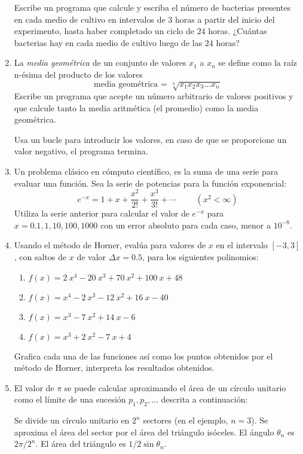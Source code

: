 \documentclass[12pt]{article}
\begin{document}
\begin{enumerate}
\par
Escribe un programa que calcule y escriba el número de bacterias presentes en cada medio de cultivo en intervalos de $3$ horas a partir del inicio del experimento, hasta haber completado un ciclo de $24$ horas. ¿Cuántas bacterias hay en cada medio de cultivo luego de las $24$ horas?
\item La \textit{media geométrica} de un conjunto de valores $x_{1}$ a $x_{n}$ se define como la raíz n-ésima del producto de los valores
\[ \text{media geométrica = } \sqrt[n]{x_{1}x_{2}x_{3} \ldots x_{n}}\]
Escribe un programa que acepte un número arbitrario de valores positivos y que calcule tanto la media aritmética (el promedio) como la media geométrica.
\par
Usa un bucle para introducir los valores, en caso de que se proporcione un valor negativo, el programa termina.
\item Un problema clásico en cómputo científico, es la suma de una serie para evaluar una función. Sea la serie de potencias para la función exponencial:
\[e^{-x} = 1 + x + \dfrac{x^{2}}{2!} + \dfrac{x^{3}}{3!} +\cdots \hspace{1cm} (x^{2} < \infty)  \]
Utiliza la serie anterior para calcular el valor de $e^{-x}$ para $x=0.1, 1, 10, 100, 1000$ con un error absoluto para cada caso, menor a $10^{-8}$.
\item Usando el método de Horner, evalúa para valores de $x$ en el intervalo $[-3,3]$, con saltos de $x$ de valor $\Delta x = 0.5$, para los siguientes polinomios:
\begin{enumerate}
\item $f(x) = 2 \: x^{4} - 20\: x^{3} + 70 \: x^{2} + 100 \: x + 48$
\item $f(x) = x^{4} - 2 \: x^{3} - 12 \: x^{2} + 16 \: x - 40$
\item $f(x) = x^{3} - 7 \: x^{2} + 14 \: x - 6$
\item $f(x) = x^{3} + 2 \: x^{2} -  7 \: x + 4$
\end{enumerate}
Grafica cada una de las funciones así como los puntos obtenidos por el método de Horner, interpreta los resultados obtenidos.
\item El valor de $\pi$ se puede calcular aproximando el área de un círculo unitario como el límite de una sucesión $p_{1}, p_{2}, \ldots$ descrita a continuación:
\par
Se divide un círculo unitario en $2^{n}$ sectores (en el ejemplo, $n=3$). Se aproxima el área del sector por el área del triángulo isóceles. El ángulo $\theta_{n}$ es $2 \pi / 2^{n}$. El área del triángulo es $1/2 \sin \theta_{n}$.

\end{enumerate}
\end{document}
